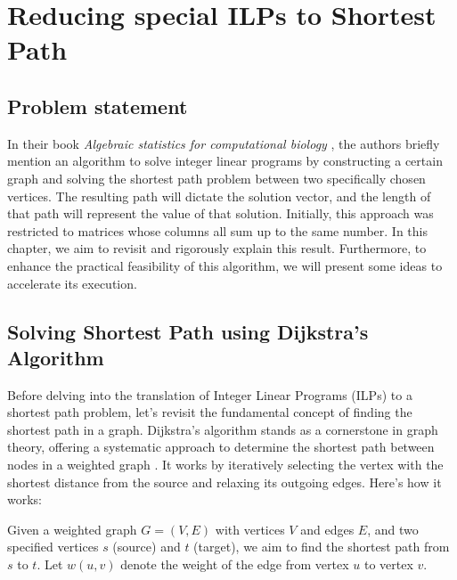 \chapter{Reducing special ILPs to Shortest Path}
\section{Problem statement}
In their book \textit{Algebraic statistics for computational biology} \cite{algebraic_statistics}, the authors briefly mention an algorithm to solve integer linear programs by constructing a certain graph and solving the shortest path problem between two specifically chosen vertices. The resulting path will dictate the solution vector, and the length of that path will represent the value of that solution. Initially, this approach was restricted to matrices whose columns all sum up to the same number. In this chapter, we aim to revisit and rigorously explain this result. Furthermore, to enhance the practical feasibility of this algorithm, we will present some ideas to accelerate its execution.

\section{Solving Shortest Path using Dijkstra's Algorithm}
Before delving into the translation of Integer Linear Programs (ILPs) to a shortest path problem, let's revisit the fundamental concept of finding the shortest path in a graph. Dijkstra's algorithm stands as a cornerstone in graph theory, offering a systematic approach to determine the shortest path between nodes in a weighted graph \cite{introduction_to_algorithms}. It works by iteratively selecting the vertex with the shortest distance from the source and relaxing its outgoing edges. Here's how it works:

Given a weighted graph $G = (V, E)$ with vertices $V$ and edges $E$, and two specified vertices $s$ (source) and $t$ (target), we aim to find the shortest path from $s$ to $t$. Let $w(u, v)$ denote the weight of the edge from vertex $u$ to vertex $v$.

